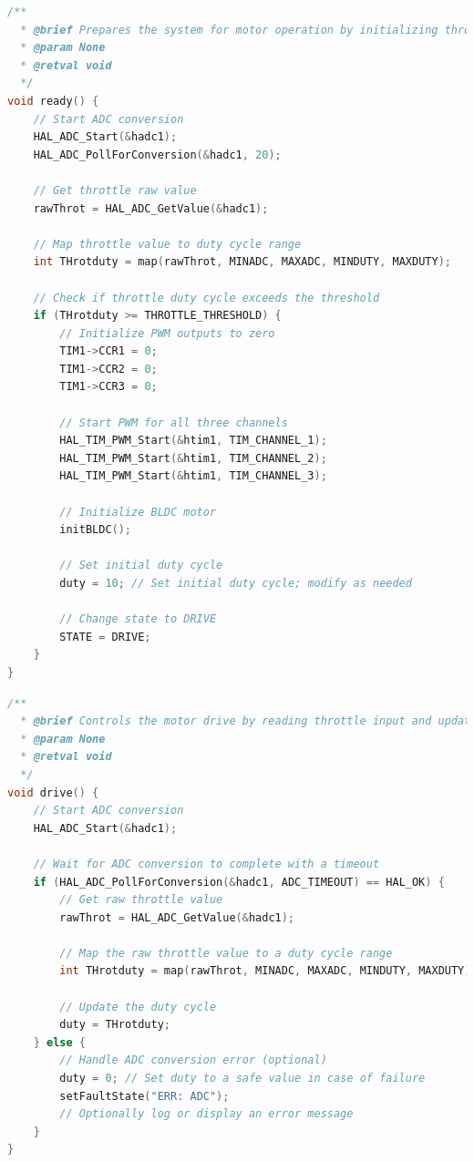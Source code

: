 \documentclass[paper=a4,11pt]{scrreprt}
\begin{document}
\begin{lstlisting}[language=C, caption=\textbf{void ready()},label={ready}, mathescape=true, breaklines=true]
/**
  * @brief Prepares the system for motor operation by initializing throttle input and PWM control
  * @param None
  * @retval void
  */
void ready() {
    // Start ADC conversion
    HAL_ADC_Start(&hadc1);
    HAL_ADC_PollForConversion(&hadc1, 20);

    // Get throttle raw value
    rawThrot = HAL_ADC_GetValue(&hadc1);

    // Map throttle value to duty cycle range
    int THrotduty = map(rawThrot, MINADC, MAXADC, MINDUTY, MAXDUTY);

    // Check if throttle duty cycle exceeds the threshold
    if (THrotduty >= THROTTLE_THRESHOLD) {
        // Initialize PWM outputs to zero
        TIM1->CCR1 = 0;
        TIM1->CCR2 = 0;
        TIM1->CCR3 = 0;

        // Start PWM for all three channels
        HAL_TIM_PWM_Start(&htim1, TIM_CHANNEL_1);
        HAL_TIM_PWM_Start(&htim1, TIM_CHANNEL_2);
        HAL_TIM_PWM_Start(&htim1, TIM_CHANNEL_3);

        // Initialize BLDC motor
        initBLDC();

        // Set initial duty cycle
        duty = 10; // Set initial duty cycle; modify as needed

        // Change state to DRIVE
        STATE = DRIVE;
    }
}
\end{lstlisting}
\newpage
\begin{lstlisting}[language=C, caption=\textbf{void drive()},label={drive}, mathescape=true, breaklines=true]
/**
  * @brief Controls the motor drive by reading throttle input and updating the PWM duty cycle
  * @param None
  * @retval void
  */
void drive() {
    // Start ADC conversion
    HAL_ADC_Start(&hadc1);

    // Wait for ADC conversion to complete with a timeout
    if (HAL_ADC_PollForConversion(&hadc1, ADC_TIMEOUT) == HAL_OK) {
        // Get raw throttle value
        rawThrot = HAL_ADC_GetValue(&hadc1);

        // Map the raw throttle value to a duty cycle range
        int THrotduty = map(rawThrot, MINADC, MAXADC, MINDUTY, MAXDUTY);

        // Update the duty cycle
        duty = THrotduty;
    } else {
        // Handle ADC conversion error (optional)
        duty = 0; // Set duty to a safe value in case of failure
        setFaultState("ERR: ADC");
        // Optionally log or display an error message
    }
}
\end{lstlisting}
\end{document}
